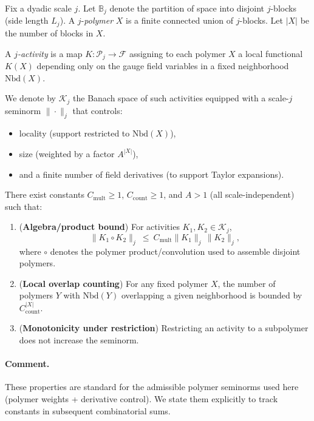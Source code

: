 Fix a dyadic scale $j$. Let $\mathbb B_j$ denote the partition of space into disjoint $j$-blocks (side length $L_j$).
A $j$-\emph{polymer} $X$ is a finite connected union of $j$-blocks.
Let $|X|$ be the number of blocks in $X$.

A \emph{$j$-activity} is a map $K:\mathscr P_j\to\mathcal F$ assigning to each polymer $X$ a local functional $K(X)$
depending only on the gauge field variables in a fixed neighborhood $\mathrm{Nbd}(X)$.

We denote by $\mathscr K_j$ the Banach space of such activities equipped with a scale-$j$ seminorm $\|\cdot\|_j$
that controls:
\begin{itemize}
\item locality (support restricted to $\mathrm{Nbd}(X)$),
\item size (weighted by a factor $A^{|X|}$),
\item and a finite number of field derivatives (to support Taylor expansions).
\end{itemize}

\begin{definition}\label{ass:seminorm_axioms}
There exist constants $C_{\mathrm{mult}}\ge 1$, $C_{\mathrm{count}}\ge 1$, and $A>1$ (all scale-independent) such that:
\begin{enumerate}[label=(S\arabic*)]
\item (\textbf{Algebra/product bound}) For activities $K_1,K_2\in\mathscr K_j$,
\[
\|K_1\circ K_2\|_j\ \le\ C_{\mathrm{mult}}\|K_1\|_j\,\|K_2\|_j,
\]
where $\circ$ denotes the polymer product/convolution used to assemble disjoint polymers.
\item (\textbf{Local overlap counting}) For any fixed polymer $X$,
the number of polymers $Y$ with $\mathrm{Nbd}(Y)$ overlapping a given neighborhood is bounded by $C_{\mathrm{count}}^{|X|}$.
\item (\textbf{Monotonicity under restriction}) Restricting an activity to a subpolymer does not increase the seminorm.
\end{enumerate}
\end{definition}

\paragraph{Comment.}
These properties are standard for the admissible polymer seminorms used here (polymer weights + derivative control).
We state them explicitly to track constants in subsequent combinatorial sums.

